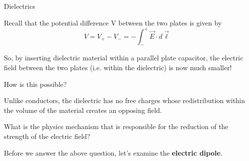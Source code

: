 %
%
%

\begin{frame}{Dielectrics}

Recall that the potential difference V between the two plates is given by
\begin{equation*}
  V = V_{+} - V_{-} = - \int_{-}^{+} \vec{E} \cdot d\vec{\ell}
\end{equation*}

\vspace{0.1cm}

So, by inserting dielectric material within a parallel plate capacitor,
the electric field between the two plates (i.e. within the dielectric) is now much smaller!\\

\vspace{0.2cm}

How is this possible?
\begin{itemize}
{\small
  \item Unlike conductors, the dielectric has no free charges whose redistribution within the
        volume of the material creates an opposing field.
  \item What is the physics mechanism that is responsible for the reduction of the strength
        of the electric field?
}
\end{itemize}

\vspace{0.2cm}

Before we answer the above question, let's examine the {\bf electric dipole}.\\

\end{frame}

%
%
%

